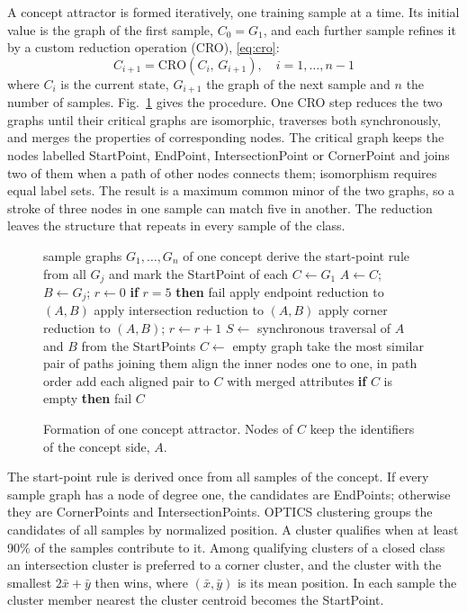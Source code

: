 A concept attractor is formed iteratively, one training sample at a time. Its initial value is the graph of the first sample, $C_0 = G_1$, and each further sample refines it by a custom reduction operation (CRO), \eqref{eq:cro}:
\begin{equation}\label{eq:cro}
C_{i+1} = \mathrm{CRO}(C_i,\, G_{i+1}), \quad i = 1, \ldots, n-1
\end{equation}
where $C_i$ is the current state, $G_{i+1}$ the graph of the next sample and $n$ the number of samples. Fig.~\ref{fig:formation} gives the procedure. One CRO step reduces the two graphs until their critical graphs are isomorphic, traverses both synchronously, and merges the properties of corresponding nodes. The critical graph keeps the nodes labelled StartPoint, EndPoint, IntersectionPoint or CornerPoint and joins two of them when a path of other nodes connects them; isomorphism requires equal label sets. The result is a maximum common minor of the two graphs, so a stroke of three nodes in one sample can match five in another. The reduction leaves the structure that repeats in every sample of the class.

\begin{figure}[t]
\footnotesize
\begin{algorithmic}[1]
\Require sample graphs $G_1, \ldots, G_n$ of one concept
\State derive the start-point rule from all $G_j$ and mark the StartPoint of each
\State $C \gets G_1$
  \State $A \gets C$;\; $B \gets G_j$;\; $r \gets 0$
    \State \textbf{if} $r = 5$ \textbf{then} fail
    \State apply endpoint reduction to $(A, B)$
    \State apply intersection reduction to $(A, B)$
    \State apply corner reduction to $(A, B)$;\; $r \gets r + 1$
  \EndWhile
  \State $S \gets$ synchronous traversal of $A$ and $B$ from the StartPoints
  \State $C \gets$ empty graph
    \State take the most similar pair of paths joining them
    \State align the inner nodes one to one, in path order
    \State add each aligned pair to $C$ with merged attributes
  \EndFor
  \State \textbf{if} $C$ is empty \textbf{then} fail
\EndFor
\State \Return $C$
\end{algorithmic}
\caption{Formation of one concept attractor. Nodes of $C$ keep the identifiers of the concept side, $A$.}
\label{fig:formation}
\end{figure}

The start-point rule is derived once from all samples of the concept. If every sample graph has a node of degree one, the candidates are EndPoints; otherwise they are CornerPoints and IntersectionPoints. OPTICS clustering groups the candidates of all samples by normalized position. A cluster qualifies when at least 90\% of the samples contribute to it. Among qualifying clusters of a closed class an intersection cluster is preferred to a corner cluster, and the cluster with the smallest $2\bar{x} + \bar{y}$ then wins, where $(\bar{x}, \bar{y})$ is its mean position. In each sample the cluster member nearest the cluster centroid becomes the StartPoint.

